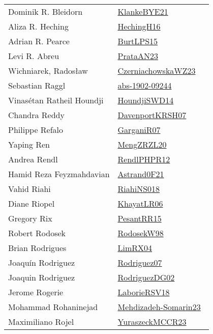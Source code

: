{\begin{longtable}{p{4cm}p{20cm}}
Dominik R. Bleidorn & \href{works/KlankeBYE21.pdf}{KlankeBYE21}~\cite{KlankeBYE21}\\
Aliza R. Heching & \href{works/HechingH16.pdf}{HechingH16}~\cite{HechingH16}\\
Adrian R. Pearce & \href{works/BurtLPS15.pdf}{BurtLPS15}~\cite{BurtLPS15}\\
Levi R. Abreu & \href{works/PrataAN23.pdf}{PrataAN23}~\cite{PrataAN23}\\
Wichniarek, Radosław & \href{works/CzerniachowskaWZ23.pdf}{CzerniachowskaWZ23}~\cite{CzerniachowskaWZ23}\\
Sebastian Raggl & \href{works/abs-1902-09244.pdf}{abs-1902-09244}~\cite{abs-1902-09244}\\
Vinas{\'{e}}tan Ratheil Houndji & \href{works/HoundjiSWD14.pdf}{HoundjiSWD14}~\cite{HoundjiSWD14}\\
Chandra Reddy & \href{works/DavenportKRSH07.pdf}{DavenportKRSH07}~\cite{DavenportKRSH07}\\
Philippe Refalo & \href{works/GarganiR07.pdf}{GarganiR07}~\cite{GarganiR07}\\
Yaping Ren & \href{works/MengZRZL20.pdf}{MengZRZL20}~\cite{MengZRZL20}\\
Andrea Rendl & \href{works/RendlPHPR12.pdf}{RendlPHPR12}~\cite{RendlPHPR12}\\
Hamid Reza Feyzmahdavian & \href{works/Astrand0F21.pdf}{Astrand0F21}~\cite{Astrand0F21}\\
Vahid Riahi & \href{works/RiahiNS018.pdf}{RiahiNS018}~\cite{RiahiNS018}\\
Diane Riopel & \href{works/KhayatLR06.pdf}{KhayatLR06}~\cite{KhayatLR06}\\
Gregory Rix & \href{works/PesantRR15.pdf}{PesantRR15}~\cite{PesantRR15}\\
Robert Rodosek & \href{works/RodosekW98.pdf}{RodosekW98}~\cite{RodosekW98}\\
Brian Rodrigues & \href{works/LimRX04.pdf}{LimRX04}~\cite{LimRX04}\\
Joaquín Rodriguez & \href{works/Rodriguez07.pdf}{Rodriguez07}~\cite{Rodriguez07}\\
Joaquin Rodriguez & \href{works/RodriguezDG02.pdf}{RodriguezDG02}~\cite{RodriguezDG02}\\
Jerome Rogerie & \href{works/LaborieRSV18.pdf}{LaborieRSV18}~\cite{LaborieRSV18}\\
Mohammad Rohaninejad & \href{works/Mehdizadeh-Somarin23.pdf}{Mehdizadeh-Somarin23}~\cite{Mehdizadeh-Somarin23}\\
Maximiliano Rojel & \href{works/YuraszeckMCCR23.pdf}{YuraszeckMCCR23}~\cite{YuraszeckMCCR23}\\

\end{longtable}}
